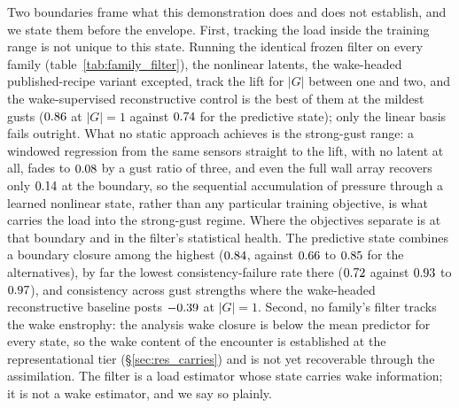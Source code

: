 Two boundaries frame what this demonstration does and does not establish, and we state them before the envelope. First, tracking the load inside the training range is not unique to this state. Running the identical frozen filter on every family (table~\ref{tab:family_filter}), the nonlinear latents, the wake-headed published-recipe variant excepted, track the lift for $|G|$ between one and two, and the wake-supervised reconstructive control is the best of them at the mildest gusts ($0.86$ at $|G| = 1$ against $0.74$ for the predictive state); only the linear basis fails outright. What no static approach achieves is the strong-gust range: a windowed regression from the same sensors straight to the lift, with no latent at all, fades to $0.08$ by a gust ratio of three, and even the full wall array recovers only $0.14$ at the boundary, so the sequential accumulation of pressure through a learned nonlinear state, rather than any particular training objective, is what carries the load into the strong-gust regime. Where the objectives separate is at that boundary and in the filter's statistical health.
The predictive state combines a boundary closure among the highest ($0.84$, against $0.66$ to $0.85$ for the alternatives), by far the lowest consistency-failure rate there ($0.72$ against $0.93$ to $0.97$), and consistency across gust strengths where the wake-headed reconstructive baseline posts $-0.39$ at $|G| = 1$. Second, no family's filter tracks the wake enstrophy: the analysis wake closure is below the mean predictor for every state, so the wake content of the encounter is established at the representational tier (\S\ref{sec:res_carries}) and is not yet recoverable through the assimilation. The filter is a load estimator whose state carries wake information; it is not a wake estimator, and we say so plainly.\re



